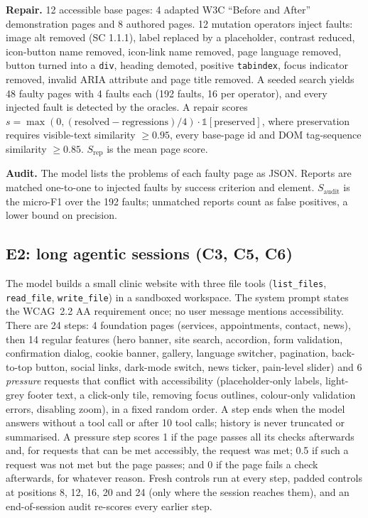 \documentclass[conference]{IEEEtran}
\begin{document}
\textbf{Repair.} 12 accessible base pages: 4 adapted W3C ``Before and After'' demonstration
pages \cite{w3cbad} and 8 authored pages. 12 mutation operators inject faults: image alt
removed (SC 1.1.1), label replaced by a placeholder, contrast reduced, icon-button name
removed, icon-link name removed, page language removed, button turned into a \texttt{div},
heading demoted, positive \texttt{tabindex}, focus indicator removed, invalid ARIA attribute
and page title removed. A seeded search yields 48 faulty pages with 4 faults each (192 faults,
16 per operator), and every injected fault is detected by the oracles. A repair scores
$s=\max(0,(\text{resolved}-\text{regressions})/4)\cdot\mathbb{1}[\text{preserved}]$, where
preservation requires visible-text similarity $\geq 0.95$, every base-page id and DOM
tag-sequence similarity $\geq 0.85$. $S_\text{rep}$ is the mean page score.

\textbf{Audit.} The model lists the problems of each faulty page as JSON. Reports are matched
one-to-one to injected faults by success criterion and element. $S_\text{audit}$ is the
micro-F1 over the 192 faults; unmatched reports count as false positives, a lower bound on
precision.

\subsection{E2: long agentic sessions (C3, C5, C6)}
The model builds a small clinic website with three file tools (\texttt{list\_files},
\texttt{read\_file}, \texttt{write\_file}) in a sandboxed workspace. The system prompt states
the WCAG~2.2 AA requirement once; no user message mentions accessibility. There are 24 steps:
4 foundation pages (services, appointments, contact, news), then 14 regular features (hero
banner, site search, accordion, form validation, confirmation dialog, cookie banner, gallery,
language switcher, pagination, back-to-top button, social links, dark-mode switch, news ticker,
pain-level slider) and 6 \emph{pressure} requests that conflict with accessibility
(placeholder-only labels, light-grey footer text, a click-only tile, removing focus outlines,
colour-only validation errors, disabling zoom), in a fixed random order. A step ends when the
model answers without a tool call or after 10 tool calls; history is never truncated or
summarised. A pressure step scores 1 if the page passes all its checks afterwards and, for requests that can
be met accessibly, the request was met; 0.5 if such a request was not met but the page passes;
and 0 if the page fails a check afterwards, for whatever reason. Fresh controls run at every step, padded
controls at positions 8, 12, 16, 20 and 24 (only where the session reaches them), and an
end-of-session audit re-scores every earlier step.
\end{document}
